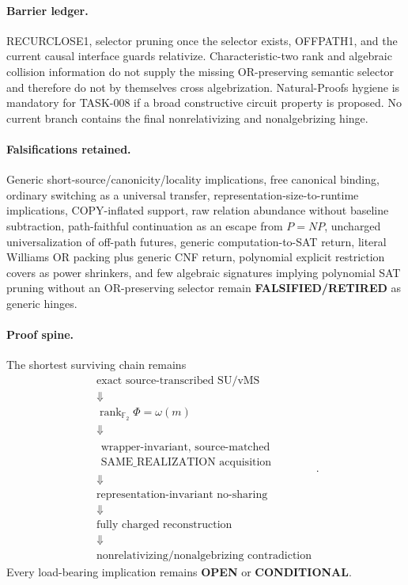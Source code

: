 \documentclass[11pt]{article}
\begin{document}
\paragraph{Barrier ledger.}
RECURCLOSE1, selector pruning once the selector exists, OFFPATH1, and the current causal
interface guards relativize. Characteristic-two rank and algebraic collision information do not
supply the missing OR-preserving semantic selector and therefore do not by themselves cross
algebrization. Natural-Proofs hygiene is mandatory for TASK-008 if a broad constructive circuit
property is proposed. No current branch contains the final nonrelativizing and nonalgebrizing hinge.

\paragraph{Falsifications retained.}
Generic short-source/canonicity/locality implications, free canonical binding, ordinary switching
as a universal transfer, representation-size-to-runtime implications, COPY-inflated support,
raw relation abundance without baseline subtraction, path-faithful continuation as an escape
from \(P=NP\), uncharged universalization of off-path futures, generic computation-to-SAT return,
literal Williams OR packing plus generic CNF return, polynomial explicit restriction covers as
power shrinkers, and few algebraic signatures implying polynomial SAT pruning without an
OR-preserving selector remain \textbf{FALSIFIED/RETIRED} as generic hinges.

\paragraph{Proof spine.}
The shortest surviving chain remains
\[
\begin{gathered}
\text{exact source-transcribed SU/vMS}
\\[-1mm]\Downarrow\\[-1mm]
\operatorname{rank}_{\mathbb F_2}\Phi=\omega(m)
\\[-1mm]\Downarrow\\[-1mm]
\substack{\text{wrapper-invariant, source-matched}\\
\text{SAME\_REALIZATION acquisition}}
\\[-1mm]\Downarrow\\[-1mm]
\text{representation-invariant no-sharing}
\\[-1mm]\Downarrow\\[-1mm]
\text{fully charged reconstruction}
\\[-1mm]\Downarrow\\[-1mm]
\text{nonrelativizing/nonalgebrizing contradiction}
\end{gathered}.
\]
Every load-bearing implication remains \textbf{OPEN} or \textbf{CONDITIONAL}.
\end{document}
